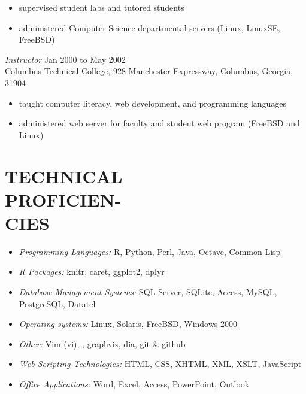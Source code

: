 \documentclass[margin, 11pt]{res} %
\begin{document}
\begin{resume}
\begin{itemize} \itemsep -2pt %
\item supervised student labs and tutored students
\item administered Computer Science departmental servers (Linux, LinuxSE, FreeBSD)
\end{itemize}

{\it Instructor} \hfill Jan 2000 to May 2002 \\
Columbus Technical College, 928 Manchester Expressway, Columbus, Georgia, 31904

\begin{itemize} \itemsep -2pt %
\item taught computer literacy, web development, and programming languages
\item administered web server for faculty and student web program (FreeBSD and Linux)
\end{itemize}


\section{TECHNICAL\\ PROFICIEN-\\ CIES}

\begin{itemize} \itemsep -2pt %

\item {\it Programming Languages:} \textsf{R}, Python, Perl, Java, Octave, Common Lisp
\item {\it \textsf{R} Packages:} knitr, caret, ggplot2, dplyr
\item {\it Database Management Systems:} SQL Server, SQLite, Access, MySQL, PostgreSQL, Datatel
\item {\it Operating systems:} Linux, Solaris, FreeBSD, Windows 2000
\item {\it Other:} Vim (vi), \LaTeXe, graphviz, dia, git \& github
\item {\it Web Scripting Technologies:} HTML, CSS, XHTML, XML, XSLT, JavaScript
\item {\it Office Applications:} Word, Excel, Access, PowerPoint, Outlook
\end{itemize}


\end{resume}
\end{document}
